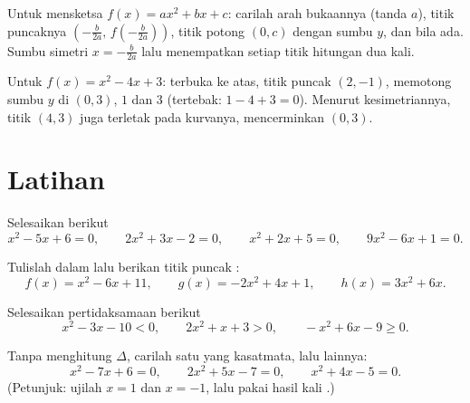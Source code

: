 \begin{method}\label{met:g11:quad:reading}
Untuk mensketsa $f(x) = ax^2+bx+c$: carilah arah bukaannya (tanda $a$),
titik puncaknya $\left(-\frac{b}{2a},\, f\!\left(-\frac{b}{2a}\right)\right)$,
titik potong $(0, c)$ dengan sumbu $y$, dan  bila ada. Sumbu
simetri $x = -\frac{b}{2a}$ lalu menempatkan setiap titik hitungan dua kali.
\end{method}

\begin{example}
Untuk $f(x) = x^2 - 4x + 3$: terbuka ke atas, titik puncak $(2, -1)$, memotong
sumbu $y$ di $(0,3)$,  $1$ dan $3$ (tertebak: $1 - 4 + 3 = 0$). Menurut
kesimetriannya, titik $(4, 3)$ juga terletak pada kurvanya, mencerminkan $(0, 3)$.
\end{example}

\section{Latihan}

\begin{exercise}[$\star$]\label{exo:g11:quad:1}
Selesaikan  berikut
\[
x^2 - 5x + 6 = 0, \qquad
2x^2 + 3x - 2 = 0, \qquad
x^2 + 2x + 5 = 0, \qquad
9x^2 - 6x + 1 = 0 .
\]
\end{exercise}

\begin{exercise}[$\star$]\label{exo:g11:quad:2}
Tulislah dalam  lalu berikan titik puncak :
\[
f(x) = x^2 - 6x + 11, \qquad
g(x) = -2x^2 + 4x + 1, \qquad
h(x) = 3x^2 + 6x .
\]
\end{exercise}

\begin{exercise}[$\star$]\label{exo:g11:quad:3}
Selesaikan pertidaksamaan berikut
\[
x^2 - 3x - 10 < 0, \qquad
2x^2 + x + 3 > 0, \qquad
-x^2 + 6x - 9 \geq 0 .
\]
\end{exercise}

\begin{exercise}[$\star$]\label{exo:g11:quad:4}
Tanpa menghitung $\Delta$, carilah satu  yang kasatmata, lalu  lainnya:
\[
x^2 - 7x + 6 = 0, \qquad
2x^2 + 5x - 7 = 0, \qquad
x^2 + 4x - 5 = 0 .
\]
(Petunjuk: ujilah $x = 1$ dan $x = -1$, lalu pakai hasil kali .)
\end{exercise}

